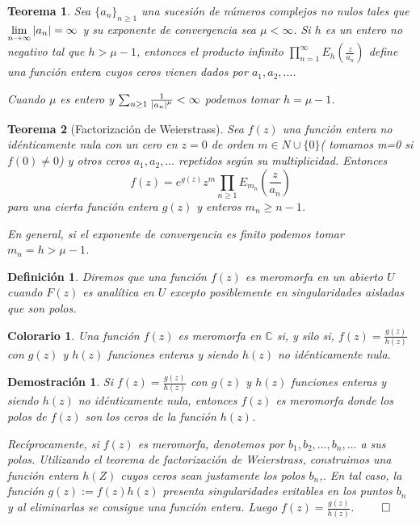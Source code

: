\documentclass[10pt]{book}
\newtheorem{defi}{Definición}[chapter]
\newtheorem{theorem}{Teorema}[chapter]
\newtheorem*{dem}{Demostración}
\newtheorem{col}{Colorario}[chapter]
\newcommand{\C}{\mathbb{C}}
\begin{document}
\begin{theorem}
Sea $\{a_n\}_{n\geq 1}$ una sucesión de números complejos no nulos tales que $\displaystyle\lim_{n\to \infty} \left| a_n\right| = \infty$ y su exponente de convergencia sea $\mu < \infty$. Si $h$ es un entero no negativo tal que $h > \mu-1$, entonces el producto infinito $\displaystyle \prod_{n=1}^\infty E_h\left(\frac{z}{a_n}\right)$ define una función entera cuyos ceros vienen dados por $a_1,a_2,\ldots$.

Cuando $\mu$ es entero y $\sum_{n\geq 1}\frac{1}{\left| a_n\right|^\mu} < \infty$ podemos tomar $h = \mu -1$.
\end{theorem}


\begin{theorem}[Factorización de Weierstrass]
Sea $f(z)$ una función entera no idénticamente nula con un cero en $z=0$ de orden $m\in N \cup \{0\}$( tomamos m=0 si $f(0) \neq 0$) y otros ceros $a_1,a_2,\ldots$ repetidos según su multiplicidad. Entonces 
$$f(z) = e^{g(z)}z^m \prod_{n\geq 1} E_{m_n}\left(\frac{z}{a_n}\right)$$
para una cierta función entera $g(z)$ y enteros $m_n \geq n-1$.

En general, si el exponente de convergencia es finito podemos tomar $m_n = h> \mu -1$.
\end{theorem}

\begin{defi}
Diremos que una función $f(z)$ es meromorfa en un abierto $U$ cuando $F(z)$ es analítica en $U$ excepto posiblemente en singularidades aisladas que son polos.
\end{defi}

\begin{col}
Una función $f(z)$ es meromorfa en $\C$ si, y silo si, $f(z) = \frac{g(z)}{h(z)}$ con $g(z)$ y $h(z)$ funciones enteras y siendo $h(z)$ no idénticamente nula.
\end{col}

\begin{dem}
Si $f(z) = \frac{g(z)}{h(z)}$ con $g(z)$ y $h(z)$ funciones enteras y siendo $h(z)$ no idénticamente nula, entonces $f(z)$ es meromorfa donde los polos de $f(z)$ son los ceros de la función $h(z)$.

Recíprocamente, si $f(z)$ es meromorfa, denotemos por $b_1,b_2,\ldots,b_n,\ldots$ a sus polos. Utilizando el teorema de factorización de Weierstrass, construimos una función entera $h(Z)$ cuyos ceros sean justamente los polos $b_n$,. En tal caso, la función $g(z):=f(z)h(z)$ presenta singularidades evitables en los puntos $b_n$ y al eliminarlas se consigue una función entera. Luego $f(z) = \frac{g(z)}{h(z)}$. $\qed$
\end{dem}
\end{document}
